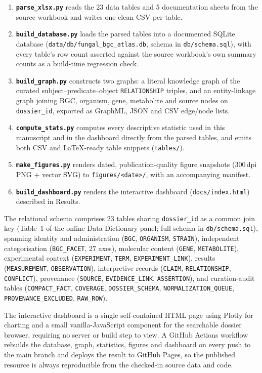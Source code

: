 \begin{enumerate}
  \item \textbf{\texttt{parse\_xlsx.py}} reads the 23 data tables and 5 documentation sheets from the
    source workbook and writes one clean CSV per table.
  \item \textbf{\texttt{build\_database.py}} loads the parsed tables into a documented SQLite
    database (\texttt{data/db/fungal\_bgc\_atlas.db}, schema in \texttt{db/schema.sql}), with every
    table's row count asserted against the source workbook's own summary counts as a build-time
    regression check.
  \item \textbf{\texttt{build\_graph.py}} constructs two graphs: a literal knowledge graph of the
    curated subject--predicate--object \texttt{RELATIONSHIP} triples, and an entity-linkage graph
    joining BGC, organism, gene, metabolite and source nodes on \texttt{dossier\_id}, exported as
    GraphML, JSON and CSV edge/node lists.
  \item \textbf{\texttt{compute\_stats.py}} computes every descriptive statistic used in this
    manuscript and in the dashboard directly from the parsed tables, and emits both CSV and
    \LaTeX{}-ready table snippets (\texttt{tables/}).
  \item \textbf{\texttt{make\_figures.py}} renders dated, publication-quality figure snapshots
    (300\,dpi PNG + vector SVG) to \texttt{figures/<date>/}, with an accompanying manifest.
  \item \textbf{\texttt{build\_dashboard.py}} renders the interactive dashboard
    (\texttt{docs/index.html}) described in Results.
\end{enumerate}

The relational schema comprises 23 tables sharing \texttt{dossier\_id} as a common join key (Table~1
of the online Data Dictionary panel; full schema in \texttt{db/schema.sql}), spanning identity and
administration (\texttt{BGC}, \texttt{ORGANISM}, \texttt{STRAIN}), independent categorisation
(\texttt{BGC\_FACET}, 27 axes), molecular content (\texttt{GENE}, \texttt{METABOLITE}), experimental
context (\texttt{EXPERIMENT}, \texttt{TERM}, \texttt{EXPERIMENT\_LINK}), results
(\texttt{MEASUREMENT}, \texttt{OBSERVATION}), interpretive records (\texttt{CLAIM},
\texttt{RELATIONSHIP}, \texttt{CONFLICT}), provenance (\texttt{SOURCE}, \texttt{EVIDENCE\_LINK},
\texttt{ASSERTION}), and curation-audit tables (\texttt{COMPACT\_FACT}, \texttt{COVERAGE},
\texttt{DOSSIER\_SCHEMA}, \texttt{NORMALIZATION\_QUEUE}, \texttt{PROVENANCE\_EXCLUDED},
\texttt{RAW\_ROW}).

The interactive dashboard is a single self-contained HTML page using Plotly for charting and a
small vanilla-JavaScript component for the searchable dossier browser, requiring no server or
build step to view. A GitHub Actions workflow rebuilds the database, graph, statistics, figures and
dashboard on every push to the main branch and deploys the result to GitHub Pages, so the published
resource is always reproducible from the checked-in source data and code.
